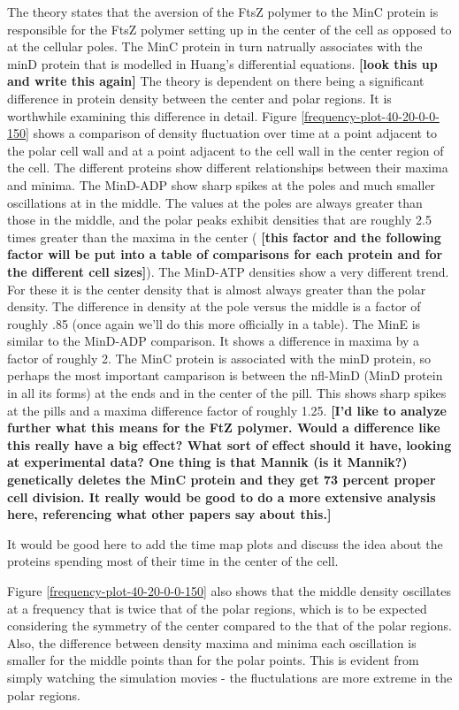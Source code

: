 \documentclass[letterpaper,twocolumn,amsmath,amssymb,pre]{revtex4-1}
\newcommand{\red}[1]{{\bf \color{red} #1}}
\newcommand{\fixme}[1]{\red{[#1]}}
\begin{document}
The theory states that the aversion of the FtsZ polymer to the MinC
protein is responsible for the FtsZ polymer setting up in the center
of the cell as opposed to at the cellular poles.  The MinC protein in
turn natrually associates with the minD protein that is modelled in
Huang's differential equations.  \fixme{look this up and write this
  again} The theory is dependent on there being a significant
difference in protein density between the center and polar regions. It
is worthwhile examining this difference in detail.  Figure
\ref{frequency-plot-40-20-0-0-150} shows a comparison of density
fluctuation over time at a point adjacent to the polar cell wall and
at a point adjacent to the cell wall in the center region of the cell.
The different proteins show different relationships between their
maxima and minima.  The MinD-ADP show sharp spikes at the poles and
much smaller oscillations at in the middle.  The values at the poles
are always greater than those in the middle, and the polar peaks
exhibit densities that are roughly 2.5 times greater than the maxima
in the center (\fixme{this factor and the following factor will be put
  into a table of comparisons for each protein and for the different
  cell sizes}).  The MinD-ATP densities show a very different trend.
For these it is the center density that is almost always greater than
the polar density.  The difference in density at the pole versus the
middle is a factor of roughly .85 (once again we'll do this more
officially in a table).  The MinE is similar to the MinD-ADP
comparison.  It shows a difference in maxima by a factor of roughly 2.
The MinC protein is associated with the minD protein, so perhaps the
most important camparison is between the nfl-MinD (MinD protein in all
its forms) at the ends and in the center of the pill.  This shows
sharp spikes at the pills and a maxima difference factor of roughly
1.25. \fixme{I'd like to analyze further what this means for the FtZ
  polymer.  Would a difference like this really have a big effect?
  What sort of effect should it have, looking at experimental data?
  One thing is that Mannik (is it Mannik?) genetically deletes the
  MinC protein and they get 73 percent proper cell division.  It
  really would be good to do a more extensive analysis here,
  referencing what other papers say about this.}

It would be good here to add the time map plots and discuss the idea
about the proteins spending most of their time in the center of the
cell.

Figure \ref{frequency-plot-40-20-0-0-150} also shows that the middle
density oscillates at a frequency that is twice that of the polar
regions, which is to be expected considering the symmetry of the
center compared to the that of the polar regions.  Also, the
difference between density maxima and minima each oscillation is
smaller for the middle points than for the polar points.  This is
evident from simply watching the simulation movies - the fluctulations
are more extreme in the polar regions.
\end{document}
